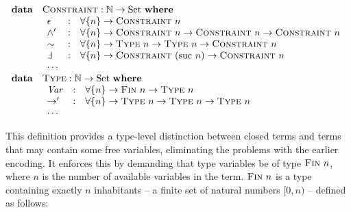 \documentclass[a4paper]{jfp}
\begin{document}
\begin{displaymath}   
	\begin{array}{ll}
		\textbf{data} & \textsc{Constraint} : \mathbb{N} \rightarrow \text{Set}\ \textbf{where} \\
		              & \begin{array}{lcl}
                         \epsilon & : & \forall \{ n \} \rightarrow \textsc{Constraint}\ n \\
						 \land'   & : & \forall \{ n \} \rightarrow \textsc{Constraint}\ n \rightarrow \textsc{Constraint}\ n \rightarrow \textsc{Constraint}\ n \\
						 \sim     & : & \forall \{ n \} \rightarrow \textsc{Type}\ n \rightarrow \textsc{Type}\ n \rightarrow \textsc{Constraint}\ n \\
						 \Finv    & : & \forall \{ n \} \rightarrow \textsc{Constraint}\ (\text{suc}\ n) \rightarrow \textsc{Constraint}\ n \\
						 \cdots \\
					    \end{array} \\
		\textbf{data} & \textsc{Type} : \mathbb{N} \rightarrow \text{Set}\ \textbf{where} \\
		              & \begin{array}{lcl}
                         \mathit{Var} & : & \forall \{ n \} \rightarrow \textsc{Fin}\ n \rightarrow \textsc{Type}\ n \\
						 \rightarrow' & : & \forall \{ n \} \rightarrow \textsc{Type}\ n \rightarrow \textsc{Type}\ n \rightarrow \textsc{Type}\ n \\
						 \cdots \\
					    \end{array} \\						
     \end{array}
\end{displaymath}	 

This definition provides a type-level distinction between closed terms and terms that may contain some free variables, eliminating the problems with the earlier encoding. It enforces this by demanding that type variables be of type $\textsc{Fin}\ n$, where $n$ is the number of available variables in the term. $\textsc{Fin}\ n$ is a type containing exactly $n$ inhabitants -- a finite set of natural numbers $[0,n)$ -- defined as follows:
\end{document}

